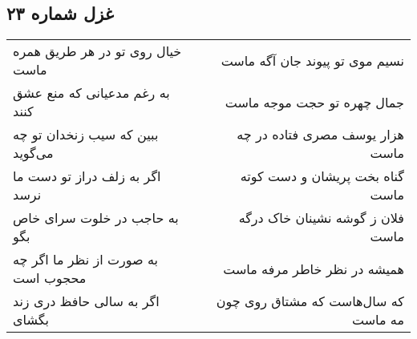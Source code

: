 \begin{center}
\section*{غزل شماره ۲۳}
\label{sec:sh023}
\begin{longtable}{l p{0.5cm} r}
خیال روی تو در هر طریق همره ماست
&&
نسیم موی تو پیوند جان آگه ماست
\\
به رغم مدعیانی که منع عشق کنند
&&
جمال چهره تو حجت موجه ماست
\\
ببین که سیب زنخدان تو چه می‌گوید
&&
هزار یوسف مصری فتاده در چه ماست
\\
اگر به زلف دراز تو دست ما نرسد
&&
گناه بخت پریشان و دست کوته ماست
\\
به حاجب در خلوت سرای خاص بگو
&&
فلان ز گوشه نشینان خاک درگه ماست
\\
به صورت از نظر ما اگر چه محجوب است
&&
همیشه در نظر خاطر مرفه ماست
\\
اگر به سالی حافظ دری زند بگشای
&&
که سال‌هاست که مشتاق روی چون مه ماست
\\
\end{longtable}
\end{center}
